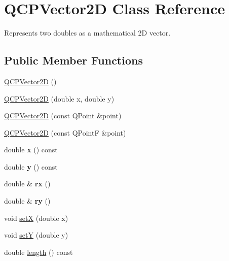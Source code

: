 \hypertarget{class_q_c_p_vector2_d}{}\section{Q\+C\+P\+Vector2D Class Reference}
\label{class_q_c_p_vector2_d}


Represents two doubles as a mathematical 2D vector.  


\subsection*{Public Member Functions}
\begin{DoxyCompactItemize}
\item 
\mbox{\hyperlink{class_q_c_p_vector2_d_a04c90748c3623044c79fa20788ffbcc6}{Q\+C\+P\+Vector2D}} ()
\item 
\mbox{\hyperlink{class_q_c_p_vector2_d_a47bd86cebc5588dad6ec84349d9098d4}{Q\+C\+P\+Vector2D}} (double x, double y)
\item 
\mbox{\hyperlink{class_q_c_p_vector2_d_ad8f30a064dc37c90a7ba5e6732ceb5bb}{Q\+C\+P\+Vector2D}} (const Q\+Point \&point)
\item 
\mbox{\hyperlink{class_q_c_p_vector2_d_a3c16eba1006c210ffc3299253fef2339}{Q\+C\+P\+Vector2D}} (const Q\+PointF \&point)
\item 
\mbox{\label{class_q_c_p_vector2_d_a4a099e1f9788d52cb46deb8139aa6195}} 
double {\bfseries x} () const
\item 
\mbox{\label{class_q_c_p_vector2_d_a6398fb643ba380d7961a4b208f4eecf1}} 
double {\bfseries y} () const
\item 
\mbox{\label{class_q_c_p_vector2_d_a1516252dac9eb5ffb7ddb17fb26e60e0}} 
double \& {\bfseries rx} ()
\item 
\mbox{\label{class_q_c_p_vector2_d_aa8f59a5b54aec8be8e4d1f39db892fea}} 
double \& {\bfseries ry} ()
\item 
void \mbox{\hyperlink{class_q_c_p_vector2_d_ab4249e6ce7bfc37be56f014c54b761ae}{setX}} (double x)
\item 
void \mbox{\hyperlink{class_q_c_p_vector2_d_ada288019aa8cd51e3b30acfc07b461dc}{setY}} (double y)
\item 
double \mbox{\hyperlink{class_q_c_p_vector2_d_a10adb5ab031fe94f0b64a3c5aefb552e}{length}} () const

\end{DoxyCompactItemize}

